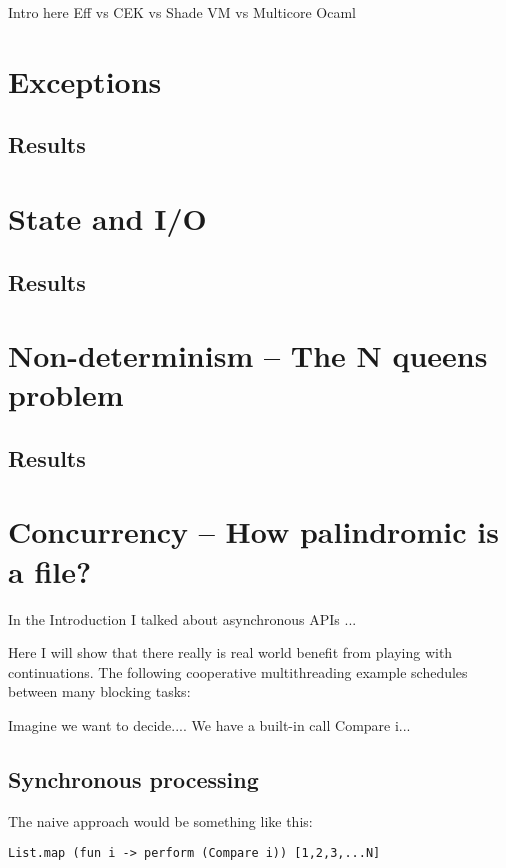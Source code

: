 \documentclass[class=article, crop=false]{standalone}
\begin{document}
Intro here
Eff vs CEK vs Shade VM vs Multicore Ocaml

\section{Exceptions}

\subsection{Results}

\section{State and I/O}

\subsection{Results}

\section{Non-determinism -- The N queens problem}

\subsection{Results}

\section{Concurrency -- How palindromic is a file?}

In the Introduction I talked about asynchronous APIs ...

Here I will show that there really is real world benefit from playing with continuations.
The following cooperative multithreading example schedules between many blocking tasks:

Imagine we want to decide....
We have a built-in call Compare i...

\subsection{Synchronous processing}

The naive approach would be something like this:

\begin{verbatim}
List.map (fun i -> perform (Compare i)) [1,2,3,...N]
\end{verbatim}
\end{document}
